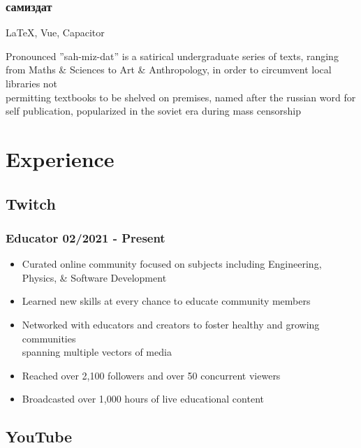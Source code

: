 \documentclass[10pt]{article} %
\begin{document}
\subsubsection{самиздат}
\begin{description}[style=multiline, leftmargin=2.75cm]
    \item[Technologies] {LaTeX, Vue, Capacitor}
    \item[Purpose] {Pronounced ''sah-miz-dat'' is a satirical undergraduate series 
        of texts, ranging from Maths \& Sciences to Art \& Anthropology, in order 
        to circumvent local libraries not \\ permitting textbooks to be shelved 
        on premises, named after the russian word for self publication, 
        popularized in the soviet era during mass censorship}  
\end{description}

\pagebreak

\section{Experience}
\subsection{Twitch}
\subsubsection{Educator \hfill 02/2021 - Present}
\begin{itemize}
    \item {Curated online community focused on subjects including Engineering,  
        \\ Physics, \& Software Development}
    \item {Learned new skills at every chance to educate community members}
    \item {Networked with educators and creators to foster healthy and growing 
        communities \\ spanning multiple vectors of media}
    \item {Reached over 2,100 followers and over 50 concurrent viewers}
    \item {Broadcasted over 1,000 hours of live educational content}
\end{itemize}

\subsection{YouTube}
\end{document}
